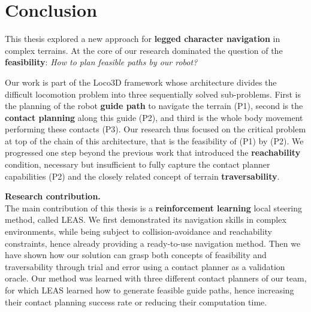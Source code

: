 \chapter{Conclusion}
\label{sec:conclusion}



This thesis explored a new approach for \textbf{legged character navigation} in complex terrains. At the core of our research dominated the question of the \textbf{feasibility}: \textit{How to plan feasible paths by our robot?}

Our work is part of the Loco3D framework whose architecture divides the difficult locomotion problem into three sequentially solved sub-problems. First is the planning of the robot \textbf{guide path} to navigate the terrain (P1), second is the \textbf{contact planning} along this guide (P2), and third is the whole body movement performing these contacts (P3).
Our research thus focused on the critical problem at top of the chain of this architecture, that is the feasibility of (P1) by (P2).
We progressed one step beyond the previous work \cite{RB-PRM} that introduced the \textbf{reachability} condition, necessary but insufficient to fully capture the contact planner capabilities (P2) and the closely related concept of terrain \textbf{traversability}.

\hfill \break

\noindent\textbf{Research contribution.}\\

The main contribution of this thesis is a \textbf{reinforcement learning} local steering method, called LEAS. We first demonstrated its navigation skills in complex environments, while being subject to collision-avoidance and reachability constraints, hence already providing a ready-to-use navigation method.
Then we have shown how our solution can grasp both concepts of feasibility and traversability through trial and error using a contact planner as a validation oracle.
Our method was learned with three different contact planners of our team, for which LEAS learned how to generate feasible guide paths, hence increasing their contact planning success rate or reducing their computation time.

